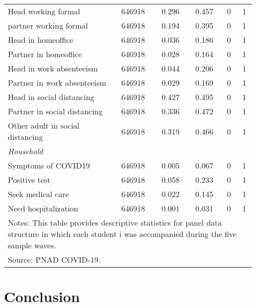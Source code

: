 \documentclass[a4paper, 12pt]{article}
\begin{document}
\begin{table}[htbp]
\begin{tabular}{l*{1}{ccccc}}
Head working formal&      646918&       0.296&       0.457&           0&           1\\
partner working formal&      646918&       0.194&       0.395&           0&           1\\
Head in homeoffice&      646918&       0.036&       0.186&           0&           1\\
Partner in homeoffice&      646918&       0.028&       0.164&           0&           1\\
Head in work absenteeism&      646918&       0.044&       0.206&           0&           1\\
Partner in work absenteeism&      646918&       0.029&       0.169&           0&           1\\
Head in social distancing&      646918&       0.427&       0.495&           0&           1\\
Partner in social distancing&      646918&       0.336&       0.472&           0&           1\\
Other adult in social distancing&      646918&       0.319&       0.466&           0&           1\\
\emph{Household}&            &            &            &            &            \\
Symptoms of COVID19&      646918&       0.005&       0.067&           0&           1\\
Positive test&      646918&       0.058&       0.233&           0&           1\\
Seek medical care&      646918&       0.022&       0.145&           0&           1\\
Need hospitalization&      646918&       0.001&       0.031&           0&           1\\
\hline\hline
\multicolumn{6}{l}{\footnotesize Notes: This table provides descriptive statistics for panel data structure in which each student i was accompanied during the five sample waves. }\\
\multicolumn{6}{l}{\footnotesize Source: PNAD COVID-19.}\\
\end{tabular}
\end{table}




\justify
\section{Conclusion} \label{Paper3-Conclusion}
\end{document}
